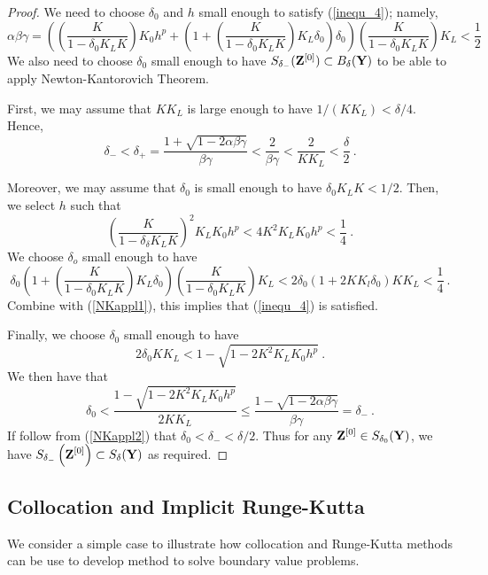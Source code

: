 \begin{proof}
We need to choose $\delta_0$ and $h$ small enough to satisfy
(\ref{inequ_4}); namely,
\[
\alpha\beta\gamma = \left( \left(\frac{K}{1-\delta_0 K_L K} \right) K_0 h^p
+ \left( 1 + \left(\frac{K}{1-\delta_0 K_L K}\right) K_L \delta_0
\right) \delta_0 \right) \left(\frac{K}{1-\delta_0 K_L K}\right) K_L
< \frac{1}{2}
\]
We also need to choose $\delta_0$ small enough to have
$S_{\delta_-}(\mathbf{Z}^{[0]}) \subset B_\delta(\mathbf{Y})$ to be able to
apply Newton-Kantorovich Theorem.

First, we may assume that $K K_L$ is large enough to have
$1/(K K_L) < \delta/4$.  Hence,
\begin{equation} \label{NKappl2}
\delta_- < \delta_+ = \frac{1 + \sqrt{1 -2\alpha\beta\gamma}}{\beta\gamma}
< \frac{2}{\beta \gamma} < \frac{2}{K K_L} < \frac{\delta}{2} \ .
\end{equation}

Moreover, we may assume that $\delta_0$ is small enough to have
$\delta_0 K_L K < 1/2$.  Then, we select $h$ such that
\begin{equation} \label{NKappl1}
\left(\frac{K}{1-\delta_\delta K_L K} \right)^2 K_L K_0 h^p
< 4 K^2 K_L K_0 h^p < \frac{1}{4} \ .
\end{equation}
We choose $\delta_o$ small enough to have
\[
\delta_0 \left( 1 + \left(\frac{K}{1-\delta_0 K_L K}\right) K_L \delta_0
\right) \left(\frac{K}{1-\delta_0 K_L K}\right) K_L
< 2 \delta_0 \left( 1 + 2 K K_l\delta_0\right) K K_L
  < \frac{1}{4} \ .
\]
Combine with (\ref{NKappl1}), this implies that (\ref{inequ_4}) is
satisfied.

Finally, we choose $\delta_0$ small enough to have
\[
  2 \delta_0 K K_L < 1 - \sqrt{\displaystyle 1 - 2 K^2 K_L K_0 h^p} \ .
\]
We then have that
\[
\delta_0 < \frac{1 - \sqrt{\displaystyle 1 - 2 K^2 K_L K_0 h^p}}{2 K K_L}
\leq \frac{1 - \sqrt{1 - 2\alpha\beta\gamma}}{\beta\gamma} = \delta_-\ .
\]
If follow from (\ref{NKappl2}) that $\delta_0 < \delta_- < \delta/2$.
Thus for any $\displaystyle \mathbf{Z}^{[0]} \in S_{\delta_0}(\mathbf{Y})$, we have
$\displaystyle S_{\delta_-}\left(\mathbf{Z}^{[0]}\right) \subset
S_\delta(\mathbf{Y})$ as required.
\end{proof}

\subsection{Collocation and Implicit Runge-Kutta}

We consider a simple case to illustrate how collocation and Runge-Kutta
methods can be use to develop method to solve boundary value problems.

